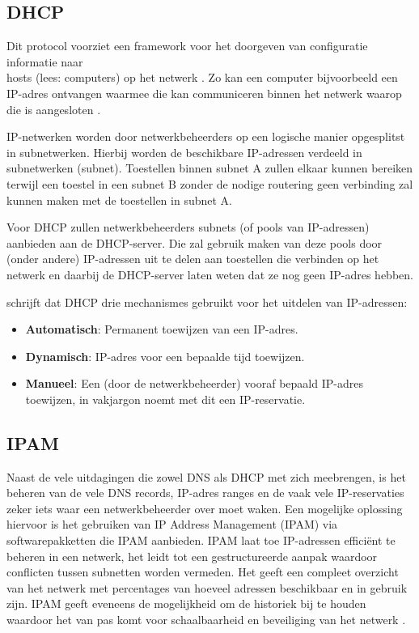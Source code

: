 \documentclass{hogent-article}
\begin{document}
\subsection{DHCP}
Dit protocol voorziet een framework voor het doorgeven van configuratie informatie naar \\hosts (lees: computers) op het netwerk . Zo kan een computer bijvoorbeeld een IP-adres ontvangen waarmee die kan communiceren binnen het netwerk waarop die is aangesloten \autocite{Droms1997}.

IP-netwerken worden door netwerkbeheerders op een logische manier opgesplitst in subnetwerken. Hierbij worden de beschikbare IP-adressen verdeeld in subnetwerken (subnet). Toestellen binnen subnet A zullen elkaar kunnen bereiken terwijl een toestel in een subnet B zonder de nodige routering geen verbinding zal kunnen maken met de toestellen in subnet A.

Voor DHCP zullen netwerkbeheerders subnets (of pools van IP-adressen) aanbieden aan de DHCP-server. Die zal gebruik maken van deze pools door (onder andere) IP-adressen uit te delen aan toestellen die verbinden op het netwerk en daarbij de DHCP-server laten weten dat ze nog geen IP-adres hebben.

\textcite{Droms1997} schrijft dat DHCP drie mechanismes gebruikt voor het uitdelen van IP-adressen:
\begin{itemize}
    \item \textbf{Automatisch}: Permanent toewijzen van een IP-adres.
    \item \textbf{Dynamisch}: IP-adres voor een bepaalde tijd toewijzen.
    \item \textbf{Manueel}: Een (door de netwerkbeheerder) vooraf bepaald IP-adres toewijzen, in vakjargon noemt met dit een IP-reservatie.
\end{itemize}

\subsection{IPAM}
Naast de vele uitdagingen die zowel DNS als DHCP met zich meebrengen, is het beheren van de vele DNS records, IP-adres ranges en de vaak vele IP-reservaties zeker iets waar een netwerkbeheerder over moet waken. 
Een mogelijke oplossing hiervoor is het gebruiken van IP Address Management (IPAM) via softwarepakketten die IPAM aanbieden.
IPAM laat toe IP-adressen efficiënt te beheren in een netwerk, het leidt tot een gestructureerde aanpak waardoor conflicten tussen subnetten worden vermeden. Het geeft een compleet overzicht van het netwerk met percentages van hoeveel adressen beschikbaar en in gebruik zijn. IPAM geeft eveneens de mogelijkheid om de historiek bij te houden waardoor het van pas komt voor schaalbaarheid en beveiliging van het netwerk \autocite{Rooney2020}.
\end{document}

